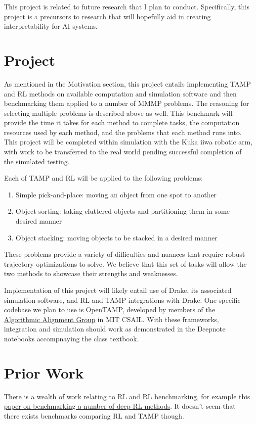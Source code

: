 \documentclass[12pt, letterpaper]{article}
\begin{document}
This project is related to future research that I plan to conduct. Specifically, this project is a precursors to research that will hopefully aid in creating interpretability for AI systems.

\section*{Project}
As mentioned in the Motivation section, this project entails implementing TAMP and RL methods on available computation and simulation software and then benchmarking them applied to a number of MMMP problems. The reasoning for selecting multiple problems is described above as well. This benchmark will provide the time it takes for each method to complete tasks, the computation resources used by each method, and the problems that each method runs into. This project will be completed within simulation with the Kuka iiwa robotic arm, with work to be transferred to the real world pending successful completion of the simulated testing.

Each of TAMP and RL will be applied to the following problems:
\begin{enumerate}
\item Simple pick-and-place: moving an object from one spot to another
\item Object sorting: taking cluttered objects and partitioning them in some desired manner
\item Object stacking: moving objects to be stacked in a desired manner
\end{enumerate}
These problems provide a variety of difficulties and nuances that require robust trajectory optimizations to solve. We believe that this set of tasks will allow the two methods to showcase their strengths and weaknesses.

Implementation of this project will likely entail use of Drake, its associated simulation software, and RL and TAMP integrations with Drake. One specific codebase we plan to use is OpenTAMP, developed by members of the \href{https://algorithmicalignment.csail.mit.edu/}{Algorithmic Alignment Group} in MIT CSAIL. With these frameworks, integration and simulation should work as demonstrated in the Deepnote notebooks accompnaying the class textbook.

\section*{Prior Work}
There is a wealth of work relating to RL and RL benchmarking, for example \href{https://arxiv.org/abs/2210.11262}{this paper on benchmarking a number of deep RL methods}. It doesn't seem that there exists benchmarks comparing RL and TAMP though.
\end{document}
